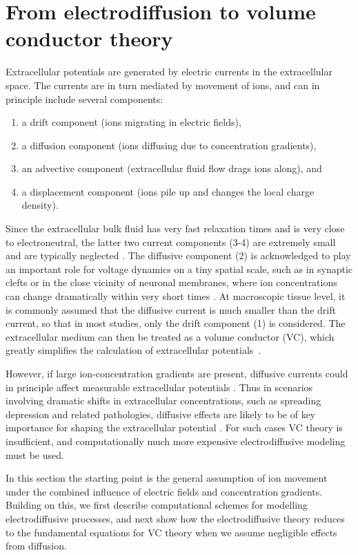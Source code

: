 \documentclass[preprint,11pt,authoryear]{elsarticle}
\begin{document}
\section{%
From electrodiffusion to volume conductor theory}
\label{sec:theory}
Extracellular potentials are generated by electric currents in the extracellular space. The currents are in turn mediated by movement of ions, and can in principle include several components:
%
\begin{enumerate}
\item a drift component (ions migrating in electric fields), 
\item a diffusion component (ions diffusing due to concentration gradients),
\item an advective component (extracellular fluid flow drags ions along), and
\item a displacement component (ions pile up and changes the local charge density). 
\end{enumerate}
%
Since the extracellular bulk fluid has very fast relaxation times and is very close to electroneutral, the latter two current components (3-4) are extremely small and are typically neglected \citep{Grodzinsky2011, Gratiy2017}. The diffusive component (2) is acknowledged to play an important role for voltage dynamics on a tiny spatial scale, such as in synaptic clefts or in the close vicinity of neuronal membranes, where ion concentrations can change dramatically within very short times \citep{Holcman2015, Savtchenko2017, Pods2017}. At macroscopic tissue level, it is commonly assumed that the diffusive current is much smaller than the drift current, so that in most studies, only the drift component (1) is considered. The extracellular medium can then be treated as a volume conductor (VC), which greatly simplifies the calculation of extracellular potentials~\citep{Holt1999, Linden2014}.

However, if large ion-concentration gradients are present, diffusive currents could in principle affect measurable extracellular potentials \citep{Halnes2016, Halnes2017, Solbra2018}. Thus in scenarios involving dramatic shifts in extracellular concentrations, such as spreading depression and related pathologies, diffusive effects are likely to be of key importance for shaping the extracellular potential \citep{Almeida2004, OConnell2016}. For such cases VC theory is insufficient, and computationally much more expensive electrodiffusive modeling must be used.

In this section the starting point is the general assumption of ion movement under the combined influence of electric fields and concentration gradients. Building on this, we first describe computational schemes for modelling electrodiffusive processes, and next show how the electrodiffusive theory reduces to the fundamental equations for VC theory when we assume negligible effects from diffusion.
\end{document}
